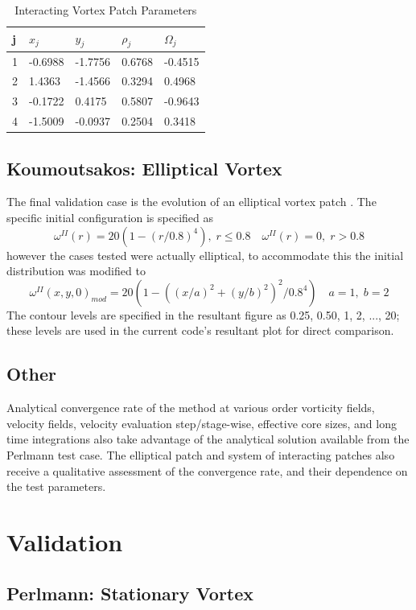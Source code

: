 \documentclass[letterpaper,12pt]{report}
\newcommand{\be}{\begin{equation}}
\newcommand{\ee}{\end{equation}}
\begin{document}
\begin{table}
\centering
\caption{Interacting Vortex Patch Parameters}\label{table:StrainTable}
\begin{tabular}{lllll}
\hline
j & $x_j$    & $y_j$    & $\rho_j$ & $\Omega_j$ \\ \hline
1 & -0.6988 & -1.7756 & 0.6768  & -0.4515   \\
2 & 1.4363  & -1.4566 & 0.3294  & 0.4968    \\
3 & -0.1722 & 0.4175  & 0.5807  & -0.9643   \\
4 & -1.5009 & -0.0937 & 0.2504  &  0.3418    \\ \hline
\end{tabular}
\end{table}

\subsection{Koumoutsakos: Elliptical Vortex}
The final validation case is the evolution of an elliptical vortex patch \cite{Koum1997}. The specific initial configuration is specified as
\be \omega^{II}(r) = 20(1-(r/0.8)^4), \; r\leq 0.8 \quad \omega^{II}(r)=0, \; r>0.8 \ee
however the cases tested were actually elliptical, to accommodate this the initial distribution was modified to
\be \omega^{II}(x,y,0)_{mod} = 20(1-((x/a)^2+(y/b)^2)^2/0.8^4 ) \quad a=1, \; b=2 \ee
The contour levels are specified in the resultant figure as 0.25, 0.50, 1, 2, ..., 20; these levels are used in the current code's resultant plot for direct comparison.

\subsection{Other}
Analytical convergence rate of the method at various order vorticity fields, velocity fields, velocity evaluation step/stage-wise, effective core sizes, and long time integrations also take advantage of the analytical solution available from the Perlmann test case. The elliptical patch and system of interacting  patches also receive a qualitative assessment of the convergence rate, and their dependence on the test parameters.

\section{Validation}
\subsection{Perlmann: Stationary Vortex}
\end{document}
